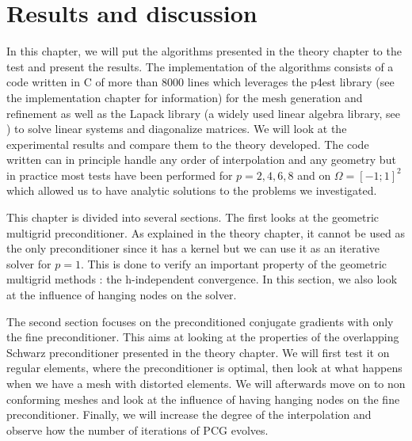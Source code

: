\chapter{Results and discussion}
In this chapter, we will put the algorithms presented in the theory chapter to the test and present the results. The implementation of the algorithms consists of a code written in C of more than 8000 lines which leverages the p4est library (see the implementation chapter for information) for the mesh generation and refinement as well as the Lapack library (a widely used linear algebra library, see \cite{lapack}) to solve linear systems and diagonalize matrices. We will look at the experimental results and compare them to the theory developed. The code written can in principle handle any order of interpolation and any geometry but in practice most tests have been performed for $p=2,4,6,8$ and on $\Omega = [-1;1]^2$ which allowed us to have analytic solutions to the problems we investigated. 

This chapter is divided into several sections. The first looks at the geometric multigrid preconditioner. As explained in the theory chapter, it cannot be used as the only preconditioner since it has a kernel but we can use it as an iterative solver for $p=1$. This is done to verify an important property of the geometric multigrid methods : the h-independent convergence. In this section, we also look at the influence of hanging nodes on the solver.

The second section focuses on the preconditioned conjugate gradients with only the fine preconditioner. This aims at looking at the properties of the overlapping Schwarz preconditioner presented in the theory chapter. We will first test it on regular elements, where the preconditioner is optimal, then look at what happens when we have a mesh with distorted elements. We will afterwards move on to non conforming meshes and look at the influence of having hanging nodes on the fine preconditioner. Finally, we will increase the degree of the interpolation and observe how the number of iterations of PCG evolves. 

